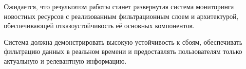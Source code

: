 Ожидается, что результатом работы станет развернутая система мониторинга новостных ресурсов с реализованным фильтрационным слоем и архитектурой, обеспечивающей отказоустойчивость её основных компонентов.

Система должна демонстрировать высокую устойчивость к сбоям, обеспечивать фильтрацию данных в реальном времени и предоставлять пользователям только актуальную и релевантную информацию.
